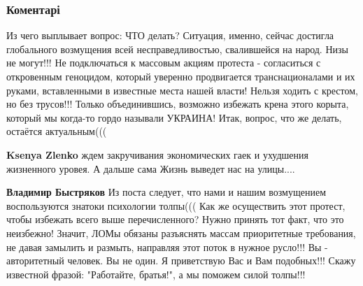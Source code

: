  
 
 
 
 
\subsubsection{Коментарі}
\label{sec:12_01_2021.fb.bystrjakov_vladimir.1.psihologia_tolpy.cmt}


\begin{itemize}


Из чего выплывает вопрос: ЧТО делать? Ситуация, именно, сейчас достигла
глобального возмущения всей несправедливостью, свалившейся на народ. Низы не
могут!!! Не подключаться к массовым акциям протеста - согласиться с откровенным
геноцидом, который уверенно продвигается транснационалами и их руками,
вставленными в известные места нашей власти! Нельзя ходить с крестом, но без
трусов!!! Только объединившись, возможно избежать крена этого корыта, который
мы когда-то гордо называли УКРАИНА! Итак, вопрос, что же делать, остаётся
актуальным(((

\begin{itemize}

 
\textbf{Ksenya Zlenko} ждем закручивания экономических гаек и ухудшения жизненного уровея. А дальше сама Жизнь выведет нас на улицы....

 
\textbf{Владимир Быстряков} Из поста следует, что нами и нашим возмущением
воспользуются знатоки психологии толпы((( Как же осуществить этот протест,
чтобы избежать всего выше перечисленного? Нужно принять тот факт, что это
неизбежно! Значит, ЛОМы обязаны разъяснять массам приоритетные требования, не
давая замылить и размыть, направляя этот поток в нужное русло!!! Вы -
авторитетный человек. Вы не один. Я приветствую Вас и Вам подобных!!! Скажу
известной фразой: "Работайте, братья!", а мы поможем силой толпы!!!
\end{itemize}


\end{itemize}

